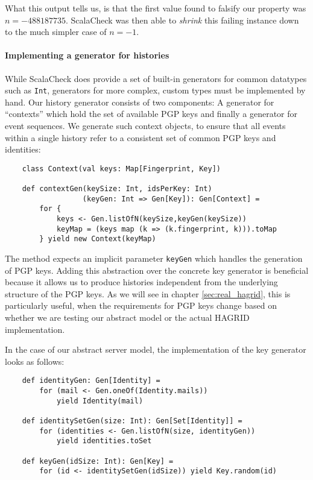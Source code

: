What this output tells us, is that the first value found to falsify our property was \(n=-488187735\). ScalaCheck was then able to \emph{shrink} this failing instance down to the much simpler case of \(n=-1\).

\paragraph{Implementing a generator for histories} 
While ScalaCheck does provide a set of built-in generators for common datatypes such as \texttt{Int}, generators for more complex, custom types must be implemented by hand. Our history generator consists of two components: A generator for ``contexts'' which hold the set of available PGP keys and finally a generator for event sequences. 
We generate such context objects, to ensure that all events within a single history refer to a consistent set of common PGP keys and identities:
\begin{verbatim}
    class Context(val keys: Map[Fingerprint, Key])

    def contextGen(keySize: Int, idsPerKey: Int)
                  (keyGen: Int => Gen[Key]): Gen[Context] = 
        for {
            keys <- Gen.listOfN(keySize,keyGen(keySize))
            keyMap = (keys map (k => (k.fingerprint, k))).toMap
        } yield new Context(keyMap)
\end{verbatim}

The method expects an implicit parameter \texttt{keyGen} which handles the generation of PGP keys. Adding this abstraction over the concrete key generator is beneficial because it allows us to produce histories independent from the underlying structure of the PGP keys. As we will see in chapter \ref{sec:real_hagrid}, this is particularly useful, when the requirements for PGP keys change based on whether we are testing our abstract model or the actual HAGRID implementation.

In the case of our abstract server model, the implementation of the key generator looks as follows: 
\begin{code}
    \begin{verbatim}
    def identityGen: Gen[Identity] =
        for (mail <- Gen.oneOf(Identity.mails)) 
            yield Identity(mail)
    
    def identitySetGen(size: Int): Gen[Set[Identity]] =
        for (identities <- Gen.listOfN(size, identityGen)) 
            yield identities.toSet

    def keyGen(idSize: Int): Gen[Key] =
        for (id <- identitySetGen(idSize)) yield Key.random(id)
    \end{verbatim}
\end{code}

